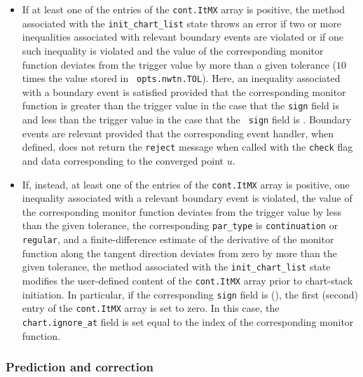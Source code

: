 \documentclass{article}
\begin{document}
\begin{itemize}
\item If at least one of the entries of the \texttt{cont.ItMX} array is
positive, the method associated with the \texttt{init\_chart\_list} state
throws an error if two or more inequalities associated with relevant
boundary events are violated or if one such inequality is violated and the
value of the corresponding monitor function deviates from the trigger value
by more than a given tolerance ($10$ times the value stored in \texttt{%
opts.nwtn.TOL}). Here, an inequality associated with a boundary event is
satisfied provided that the corresponding monitor function is greater than
the trigger value in the case that the \texttt{sign} field is \texttt{%
\TEXTsymbol{<}} and less than the trigger value in the case that the \texttt{%
sign} field is \texttt{\TEXTsymbol{>}}. Boundary events are relevant
provided that the corresponding event handler, when defined, does not return
the \texttt{reject} message when called with the \texttt{check} flag and
data corresponding to the converged point $u$.

\item If, instead, at least one of the entries of the \texttt{cont.ItMX}
array is positive, one inequality associated with a relevant boundary event
is violated, the value of the corresponding monitor function deviates from
the trigger value by less than the given tolerance, the corresponding 
\texttt{par\_type} is \texttt{continuation} or \texttt{regular}, and a
finite-difference estimate of the derivative of the monitor function along
the tangent direction deviates from zero by more than the given tolerance,
the method associated with the \texttt{init\_chart\_list} state modifies the
user-defined content of the \texttt{cont.ItMX} array prior to chart-stack
initiation. In particular, if the corresponding \texttt{sign} field is 
\texttt{\TEXTsymbol{>}} (\texttt{\TEXTsymbol{<}}), the first (second) entry
of the \texttt{cont.ItMX} array is set to zero. In this case, the \texttt{%
chart.ignore\_at} field is set equal to the index of the corresponding
monitor function.
\end{itemize}

\subsubsection{Prediction and correction}
\end{document}
